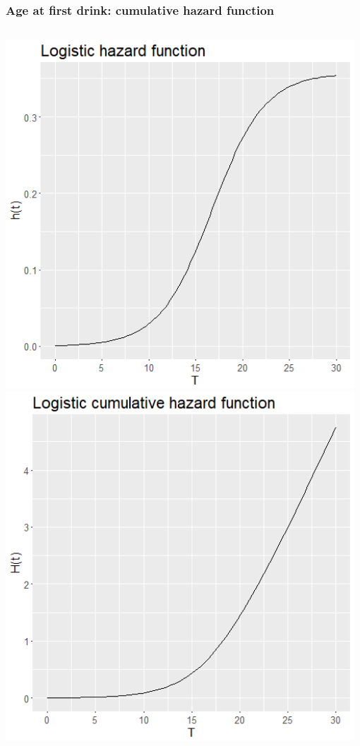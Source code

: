 \begin{frame}
\frametitle{Age at first drink: cumulative hazard function}
\begin{columns}
\includegraphics[width=0.98\textwidth]{Figures/drink_haz_log.png}
\includegraphics[width=0.98\textwidth]{Figures/drink_cum_haz_log.png}
\end{columns}
\end{frame}

